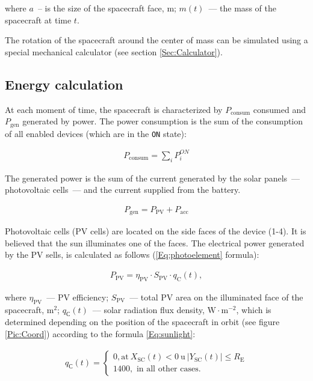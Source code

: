 \documentclass[12pt,a4paper]{article}
\begin{document}
where $a$~-- is the size of the spacecraft face, m; $m(t)$~--- the mass of the spacecraft at time $t$.

The rotation of the spacecraft around the center of mass can be simulated using a special mechanical calculator (see section \ref{Sec:Calculator}).

\subsection{Energy calculation}
\label{Sec:Energy}

At each moment of time, the spacecraft is characterized by $P_{\text{consum}}$ consumed and $P_{\text{gen}}$ generated by power. The power consumption is the sum of the consumption of all enabled devices (which are in the \verb'ON' state):

\begin{eqnarray}
   P_{\text{consum}} = \sum_i{P_{i}^{ON}}
\end{eqnarray}

The generated power is the sum of the current generated by the solar panels~--– photovoltaic cells~--- and the current supplied from the battery.

\begin{eqnarray}
  P_{\text{gen}} = P_{\text{PV}} + P_{\text{acc}}
\end{eqnarray}

Photovoltaic cells (PV cells) are located on the side faces of the device (1-4). It is believed that the sun illuminates one of the faces. The electrical power generated by the PV sells,
is calculated as follows (\ref{Eq:photoelement} formula):

\begin{eqnarray}
  P_{\text{PV}} = \eta_{\text{PV}} \cdot S_{\text{PV}} \cdot q_{\text{C}}(t), \label{Eq:photoelement}
\end{eqnarray}

where $\eta_{\text{PV}}$~--- PV efficiency; $S_{\text{PV}}$~--- total PV area on the illuminated face of the spacecraft, $\text{m}^2$; $q_{\text{С}}(t)$~--– solar radiation flux density, $\text{W} \cdot \text{m}^{-2}$, which is determined depending on the position of the spacecraft in orbit (see figure \ref{Pic:Coord}) according to the formula \ref{Eq:sunlight}:

\begin{eqnarray}
   q_{\text{С}}(t) = \left\{
   \begin{array}{l}
     0, \text{at}~X_{\text{SC}}(t) < 0~\text{u}~|Y_{\text{SC}}(t)| \leqslant R_{\text{E}}\\
     1400, \text{ in all other cases.}
   \end{array}
\right. \label{Eq:sunlight}
\end{eqnarray}
\end{document}
